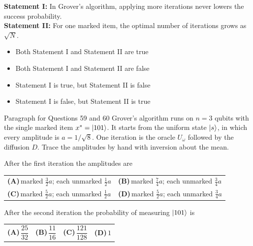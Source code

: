 \documentclass[11pt,a4paper]{article}
\newcommand{\optlabel}[1]{\textbf{(#1)}}
\newenvironment{qitem}[1]{\begin{list}{}{\setlength{\leftmargin}{3.3em}\setlength{\labelwidth}{3.1em}%
  \setlength{\labelsep}{0.2em}\setlength{\topsep}{3pt}\setlength{\parsep}{3pt}}\item[\textbf{Q.#1}\hfill]}{\end{list}}
\newcommand{\qsep}{\par\vspace{2pt}{\color{black!15}\hrule}\vspace{4pt}}
\begin{document}
\begin{qitem}{58}
\textbf{Statement I:} In Grover's algorithm, applying more iterations never lowers the success probability.\\[1mm]
\textbf{Statement II:} For one marked item, the optimal number of iterations grows as $\sqrt N$.
\begin{itemize}[leftmargin=2.6em, labelsep=0.4em, itemsep=2pt, topsep=3pt]
\item[\optlabel{A}] Both Statement I and Statement II are true
\item[\optlabel{B}] Both Statement I and Statement II are false
\item[\optlabel{C}] Statement I is true, but Statement II is false
\item[\optlabel{D}] Statement I is false, but Statement II is true
\end{itemize}
\end{qitem}
\qsep

\begin{passagebox}{Paragraph for Questions 59 and 60}
Grover's algorithm runs on $n = 3$ qubits with the single marked item $x^\ast = \ket{101}$. It starts from the uniform state $\ket{s}$, in which every
amplitude is $a = 1/\sqrt8$. One iteration is the oracle $U_\omega$ followed by the diffusion $D$. Trace the amplitudes by hand with inversion about the mean.
\end{passagebox}
\begin{qitem}{59}
After the first iteration the amplitudes are
\par\smallskip\noindent\begin{tabularx}{\linewidth}{@{}*{2}{L}@{}}
\optlabel{A}\,marked $\frac32a$; each unmarked $\frac12a$ & \optlabel{B}\,marked $\frac74a$; each unmarked $\frac34a$ \\[3pt]
\optlabel{C}\,marked $\frac52a$; each unmarked $\frac12a$ & \optlabel{D}\,marked $\frac52a$; each unmarked $\frac34a$
\end{tabularx}
\end{qitem}
\qsep

\begin{qitem}{60}
After the second iteration the probability of measuring $\ket{101}$ is
\par\smallskip\noindent\begin{tabularx}{\linewidth}{@{}*{4}{L}@{}}
\optlabel{A}\,$\dfrac{25}{32}$ & \optlabel{B}\,$\dfrac{11}{16}$ & \optlabel{C}\,$\dfrac{121}{128}$ & \optlabel{D}\,$1$
\end{tabularx}
\end{qitem}
\qsep
\end{document}
